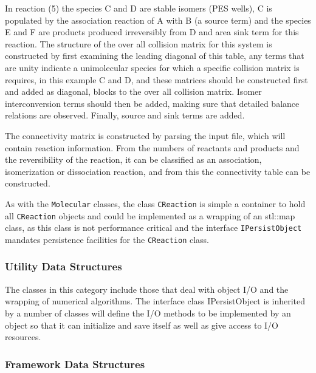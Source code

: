 In reaction (5) the species C and D are stable isomers (PES wells), C is populated by the association reaction of A with B (a source term) and the species E and F are products produced irreversibly from D and area sink term for this reaction. The structure of the over all collision matrix for this system is constructed by first examining the leading diagonal of this table, any terms that are unity indicate a unimolecular species for which a specific collision matrix is requires, in this example C and D, and these matrices should be constructed first and added as diagonal, blocks to the over all collision matrix. Isomer interconversion terms should then be added, making sure that detailed balance relations are observed. Finally, source and sink terms are added.

The connectivity matrix is constructed by parsing the input file, which will contain reaction information. From the numbers of reactants and products and the reversibility of the reaction, it can be classified as an association, isomerization or dissociation reaction, and from this the connectivity table can be constructed.

As with the \verb|Molecular| classes, the class \verb|CReaction| is simple a container to hold all \verb|CReaction| objects and could be implemented as a wrapping of an stl::map class, as this class is not performance critical and the interface \verb|IPersistObject| mandates persistence facilities for the \verb|CReaction| class.

\subsubsection{Utility Data Structures
}\label{sec:UtilityDataStructures
}

The classes in this category include those that deal with object I/O and the wrapping of numerical algorithms. The interface class IPersistObject is inherited by a number of classes will define the I/O methods to be implemented by an object so that it can initialize and save itself as well as give access to I/O resources.

\subsubsection{Framework Data Structures}\label{sec:FrameworkDataStructures}

